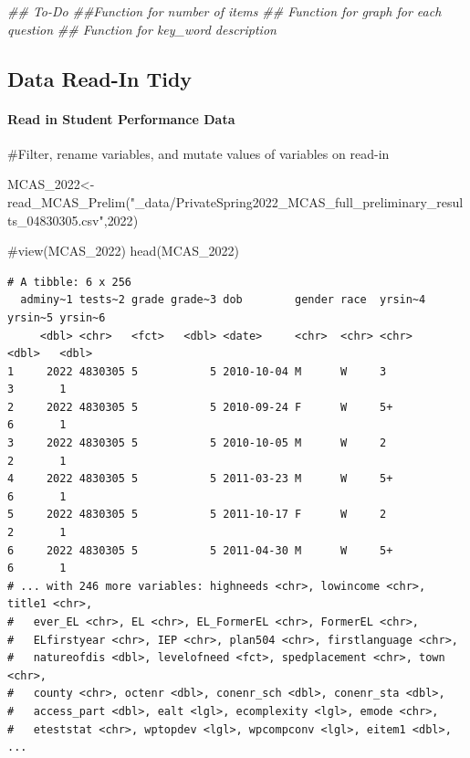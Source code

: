 \documentclass[
  letterpaper,
  DIV=11,
  numbers=noendperiod]{scrartcl}
\let\oldparagraph\paragraph
\renewcommand{\paragraph}[1]{\oldparagraph{#1}\mbox{}}
\newenvironment{Shaded}{\begin{snugshade}}{\end{snugshade}}
\newcommand{\CommentTok}[1]{\textcolor[rgb]{0.37,0.37,0.37}{#1}}
\newcommand{\DecValTok}[1]{\textcolor[rgb]{0.68,0.00,0.00}{#1}}
\newcommand{\DocumentationTok}[1]{\textcolor[rgb]{0.37,0.37,0.37}{\textit{#1}}}
\newcommand{\FunctionTok}[1]{\textcolor[rgb]{0.28,0.35,0.67}{#1}}
\newcommand{\NormalTok}[1]{\textcolor[rgb]{0.00,0.23,0.31}{#1}}
\newcommand{\OtherTok}[1]{\textcolor[rgb]{0.00,0.23,0.31}{#1}}
\newcommand{\StringTok}[1]{\textcolor[rgb]{0.13,0.47,0.30}{#1}}
\begin{document}
\begin{Shaded}
\begin{Highlighting}[]
\DocumentationTok{\#\# To{-}Do}
\DocumentationTok{\#\#Function for number of items}
\DocumentationTok{\#\# Function for graph for each question}
\DocumentationTok{\#\# Function for key\_word description}
\end{Highlighting}
\end{Shaded}

\hypertarget{data-read-in-tidy}{%
\subsection{Data Read-In Tidy}\label{data-read-in-tidy}}

\hypertarget{read-in-student-performance-data}{%
\paragraph{Read in Student Performance
Data}\label{read-in-student-performance-data}}

\begin{Shaded}
\begin{Highlighting}[]
\CommentTok{\#Filter, rename variables, and mutate values of variables on read{-}in}

\NormalTok{MCAS\_2022}\OtherTok{\textless{}{-}}\FunctionTok{read\_MCAS\_Prelim}\NormalTok{(}\StringTok{"\_data/PrivateSpring2022\_MCAS\_full\_preliminary\_results\_04830305.csv"}\NormalTok{,}\DecValTok{2022}\NormalTok{)}

\CommentTok{\#view(MCAS\_2022)}
\FunctionTok{head}\NormalTok{(MCAS\_2022)}
\end{Highlighting}
\end{Shaded}

\begin{verbatim}
# A tibble: 6 x 256
  adminy~1 tests~2 grade grade~3 dob        gender race  yrsin~4 yrsin~5 yrsin~6
     <dbl> <chr>   <fct>   <dbl> <date>     <chr>  <chr> <chr>     <dbl>   <dbl>
1     2022 4830305 5           5 2010-10-04 M      W     3             3       1
2     2022 4830305 5           5 2010-09-24 F      W     5+            6       1
3     2022 4830305 5           5 2010-10-05 M      W     2             2       1
4     2022 4830305 5           5 2011-03-23 M      W     5+            6       1
5     2022 4830305 5           5 2011-10-17 F      W     2             2       1
6     2022 4830305 5           5 2011-04-30 M      W     5+            6       1
# ... with 246 more variables: highneeds <chr>, lowincome <chr>, title1 <chr>,
#   ever_EL <chr>, EL <chr>, EL_FormerEL <chr>, FormerEL <chr>,
#   ELfirstyear <chr>, IEP <chr>, plan504 <chr>, firstlanguage <chr>,
#   natureofdis <dbl>, levelofneed <fct>, spedplacement <chr>, town <chr>,
#   county <chr>, octenr <dbl>, conenr_sch <dbl>, conenr_sta <dbl>,
#   access_part <dbl>, ealt <lgl>, ecomplexity <lgl>, emode <chr>,
#   eteststat <chr>, wptopdev <lgl>, wpcompconv <lgl>, eitem1 <dbl>, ...
\end{verbatim}
\end{document}
